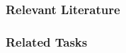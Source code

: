 \subsection{Relevant Literature}
\begin{refsection}
\nocite{test,alang2017police,clayton2018black}
\printbibliography[heading=none]
\end{refsection}
%
\subsection{Related Tasks}
\fourdThree{}\\
\fourdFour{}\\
\fourdFive{}\\
\fourfSeven{}\\
%
%
%
%
%
%
%
\chapter{\foursecg{}}
%
\section[\fourgOne{}]{\fourgOne{}%
              }
